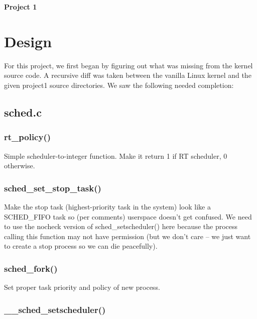\documentclass[11pt,letterpaper]{article}
\begin{document}



\begin{center} \large \textbf{Project 1} \end{center}

\section{Design}
For this project, we first began by figuring out what was missing from the kernel source code.
A recursive diff was taken between the vanilla Linux kernel and the given project1 source directories. We saw the following needed completion:



\subsection{sched.c}

\subsubsection{rt\_policy()}

Simple scheduler-to-integer function. Make it return 1 if RT scheduler, 0 otherwise.

\subsubsection{sched\_set\_stop\_task()}

Make the stop task (highest-priority task in the system) look like a SCHED\_FIFO task so (per comments) userspace doesn't get confused. We need to use the nocheck version of sched\_setscheduler() here because the process calling this function may not have permission (but we don't care -- we just want to create a stop process so we can die peacefully).

\subsubsection{sched\_fork()}

Set proper task priority and policy of new process.

\subsubsection{\_\_sched\_setscheduler()}
\end{document}
